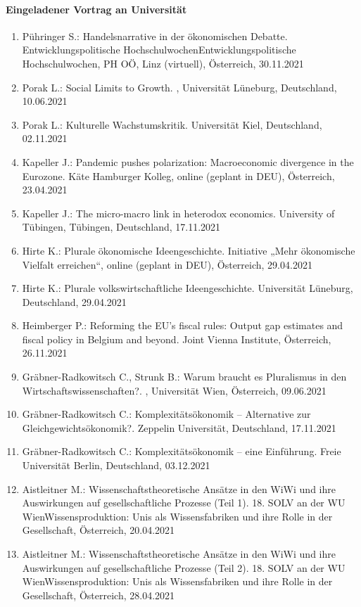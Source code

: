 \paragraph{Eingeladener Vortrag an Universität}
\begin{enumerate}
	\item Pühringer S.: Handelsnarrative in der ökonomischen Debatte. Entwicklungspolitische HochschulwochenEntwicklungspolitische Hochschulwochen, PH OÖ, Linz (virtuell), Österreich, 30.11.2021
	\item Porak L.: Social Limits to Growth. , Universität Lüneburg, Deutschland, 10.06.2021
	\item Porak L.: Kulturelle Wachstumskritik. Universität Kiel, Deutschland, 02.11.2021
	\item Kapeller J.: Pandemic pushes polarization: Macroeconomic divergence in the Eurozone. Käte Hamburger Kolleg, online (geplant in DEU), Österreich, 23.04.2021
	\item Kapeller J.: The micro-macro link in heterodox economics. University of Tübingen, Tübingen, Deutschland, 17.11.2021
	\item Hirte K.: Plurale ökonomische Ideengeschichte. Initiative „Mehr ökonomische Vielfalt erreichen“, online (geplant in DEU), Österreich, 29.04.2021
	\item Hirte K.: Plurale volkswirtschaftliche Ideengeschichte. Universität Lüneburg, Deutschland, 29.04.2021
	\item Heimberger P.: Reforming the EU’s fiscal rules: Output gap estimates and fiscal policy in Belgium and beyond. Joint Vienna Institute, Österreich, 26.11.2021
	\item Gräbner-Radkowitsch C., Strunk B.: Warum braucht es Pluralismus in den Wirtschaftswissenschaften?. , Universität Wien, Österreich, 09.06.2021
	\item Gräbner-Radkowitsch C.: Komplexitätsökonomik – Alternative zur Gleichgewichtsökonomik?. Zeppelin Universität, Deutschland, 17.11.2021
	\item Gräbner-Radkowitsch C.: Komplexitätsökonomik – eine Einführung. Freie Universität Berlin, Deutschland, 03.12.2021
	\item Aistleitner M.: Wissenschaftstheoretische Ansätze in den WiWi und ihre Auswirkungen auf gesellschaftliche Prozesse (Teil 1). 18. SOLV an der WU WienWissensproduktion: Unis als Wissensfabriken und ihre Rolle in der Gesellschaft, Österreich, 20.04.2021
	\item Aistleitner M.: Wissenschaftstheoretische Ansätze in den WiWi und ihre Auswirkungen auf gesellschaftliche Prozesse (Teil 2). 18. SOLV an der WU WienWissensproduktion: Unis als Wissensfabriken und ihre Rolle in der Gesellschaft, Österreich, 28.04.2021
\end{enumerate}
